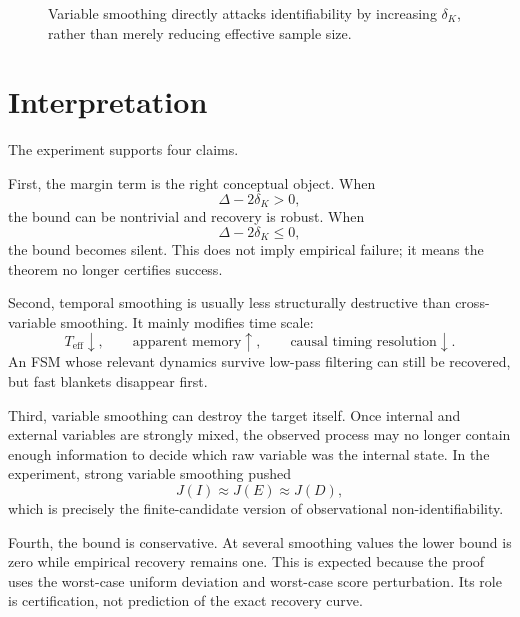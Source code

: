 \documentclass[10pt]{article}
\newcommand{\eff}{\mathrm{eff}}
\begin{document}
\begin{figure}[h]
\centering
{}
\caption{Variable smoothing directly attacks identifiability by increasing \(\delta_K\), rather than merely reducing effective sample size.}
\label{fig:variable}
\end{figure}

\section{Interpretation}

The experiment supports four claims.

First, the margin term is the right conceptual object. When
\[
\Delta-2\delta_K>0,
\]
the bound can be nontrivial and recovery is robust. When
\[
\Delta-2\delta_K\le0,
\]
the bound becomes silent. This does not imply empirical failure; it means the theorem no longer certifies success.

Second, temporal smoothing is usually less structurally destructive than cross-variable smoothing. It mainly modifies time scale:
\[
T_{\eff}\downarrow,
\qquad
\text{apparent memory}\uparrow,
\qquad
\text{causal timing resolution}\downarrow.
\]
An FSM whose relevant dynamics survive low-pass filtering can still be recovered, but fast blankets disappear first.

Third, variable smoothing can destroy the target itself. Once internal and external variables are strongly mixed, the observed process may no longer contain enough information to decide which raw variable was the internal state. In the experiment, strong variable smoothing pushed
\[
J(I)\approx J(E)\approx J(D),
\]
which is precisely the finite-candidate version of observational non-identifiability.

Fourth, the bound is conservative. At several smoothing values the lower bound is zero while empirical recovery remains one. This is expected because the proof uses the worst-case uniform deviation and worst-case score perturbation. Its role is certification, not prediction of the exact recovery curve.
\end{document}
